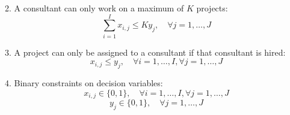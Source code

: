 \documentclass{article}
\begin{document}
2. A consultant can only work on a maximum of \( K \) projects:
\[
\sum_{i=1}^{I} x_{i,j} \leq K y_j, \quad \forall j = 1, \ldots, J
\]

3. A project can only be assigned to a consultant if that consultant is hired:
\[
x_{i,j} \leq y_j, \quad \forall i = 1, \ldots, I, \forall j = 1, \ldots, J
\]

4. Binary constraints on decision variables:
\[
x_{i,j} \in \{0, 1\}, \quad \forall i = 1, \ldots, I, \forall j = 1, \ldots, J
\]
\[
y_j \in \{0, 1\}, \quad \forall j = 1, \ldots, J
\]
\end{document}
